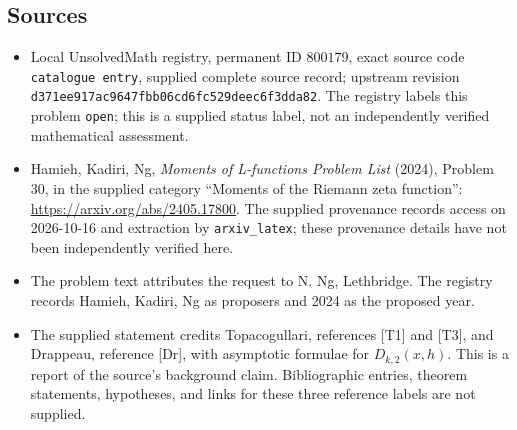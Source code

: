 \documentclass[11pt]{article}
\begin{document}
\subsection{Sources}
\begin{itemize}
\item Local UnsolvedMath registry, permanent ID \(800179\), exact source code \texttt{catalogue entry}, supplied complete source record; upstream revision \texttt{d371ee917ac9647fbb06cd6fc529deec6f3dda82}. The registry labels this problem \texttt{open}; this is a supplied status label, not an independently verified mathematical assessment.
\item Hamieh, Kadiri, Ng, \emph{Moments of L-functions Problem List} (2024), Problem 30, in the supplied category ``Moments of the Riemann zeta function'': \url{https://arxiv.org/abs/2405.17800}. The supplied provenance records access on 2026-10-16 and extraction by \texttt{arxiv\_latex}; these provenance details have not been independently verified here.
\item The problem text attributes the request to N. Ng, Lethbridge. The registry records Hamieh, Kadiri, Ng as proposers and 2024 as the proposed year.
\item The supplied statement credits Topacogullari, references [T1] and [T3], and Drappeau, reference [Dr], with asymptotic formulae for \(D_{k,2}(x,h)\). This is a report of the source's background claim. Bibliographic entries, theorem statements, hypotheses, and links for these three reference labels are not supplied.
\end{itemize}
\end{document}

